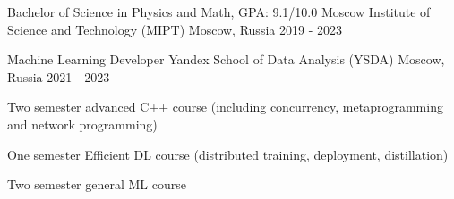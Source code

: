 
\begin{cventries}
  \cventry
    {Bachelor of Science in Physics and Math, GPA: 9.1/10.0} %
    {Moscow Institute of Science and Technology (MIPT)} %
    {Moscow, Russia} %
    {2019 - 2023} %
    {}
    
  \cventry
    {Machine Learning Developer}
    {Yandex School of Data Analysis (YSDA)}
    {Moscow, Russia}
    {2021 - 2023}
    {
       \begin{cvitems} %
        \item {Two semester advanced C++ course (including concurrency, metaprogramming and network programming)}
        \item {One semester Efficient DL course (distributed training, deployment, distillation)}
        \item {Two semester general ML course}
      \end{cvitems}
    }
\end{cventries}

